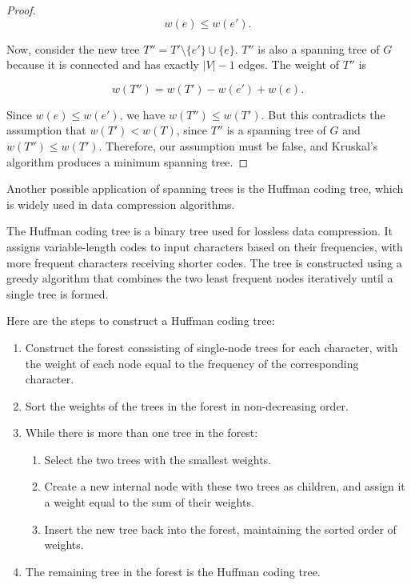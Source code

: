 \documentclass[oneside]{book}
\begin{document}
\begin{proof}
\[w(e) \leq w(e').\]

Now, consider the new tree $T'' = T' \setminus \{e' \} \cup \{e\}$. $T''$ is also a spanning tree of $G$ because it is connected and has exactly $|V|-1$ edges. The weight of $T''$ is

\[w(T'') = w(T') - w(e') + w(e).\]

Since $w(e) \leq w(e')$, we have $w(T'') \leq w(T')$. But this contradicts the assumption that $w(T') < w(T)$, since $T''$ is a spanning tree of $G$ and $w(T'') \leq w(T')$. Therefore, our assumption must be false, and Kruskal's algorithm produces a minimum spanning tree.

\end{proof}

Another possible application of spanning trees is the Huffman coding tree, which is widely used in data compression algorithms.

The Huffman coding tree is a binary tree used for lossless data compression. It assigns variable-length codes to input characters based on their frequencies, with more frequent characters receiving shorter codes. The tree is constructed using a greedy algorithm that combines the two least frequent nodes iteratively until a single tree is formed.

Here are the steps to construct a Huffman coding tree:
\begin{enumerate}
    \item Construct the forest conssisting of single-node trees for each character, with the weight of each node equal to the frequency of the corresponding character.
    \item Sort the weights of the trees in the forest in non-decreasing order.
    \item While there is more than one tree in the forest:
    \begin{enumerate}
        \item Select the two trees with the smallest weights.
        \item Create a new internal node with these two trees as children, and assign it a weight equal to the sum of their weights.
        \item Insert the new tree back into the forest, maintaining the sorted order of weights.
    \end{enumerate}
    \item The remaining tree in the forest is the Huffman coding tree.
\end{enumerate}
\end{document}

